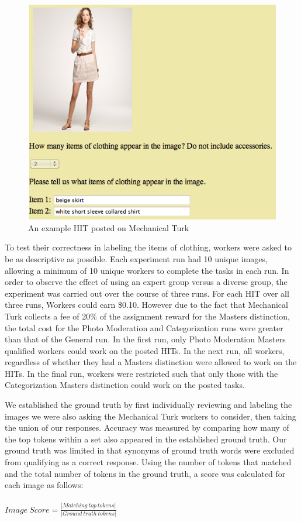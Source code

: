 \documentclass{chi2012}
\newcommand{\tab}{\hspace*{2em}}
\begin{document}
\begin{figure}
\centering
\includegraphics[width=0.9\columnwidth]{Figure1}
\caption{An example HIT posted on Mechanical Turk}
\label{fig:figure1}
\end{figure}

\tab To test their correctness in labeling the items of clothing, workers were asked to be as descriptive as possible. Each experiment run had 10 unique images, allowing a minimum of 10 unique workers to complete the tasks in each run. In order to observe the effect of using an expert group versus a diverse group, the experiment was carried out over the course of three runs. For each HIT over all three runs, Workers could earn \$0.10. However due to the fact that Mechanical Turk collects a fee of 20\% of the assignment reward for the Masters distinction, the total cost for the Photo Moderation and Categorization runs were greater than that of the General run. In the first run, only Photo Moderation Masters qualified workers could work on the posted HITs. In the next run, all workers, regardless of whether they had a Masters distinction were allowed to work on the HITs. In the final run, workers were restricted such that only those with the Categorization Masters distinction could work on the posted tasks. 

We established the ground truth by first individually reviewing and labeling the images we were also asking the Mechanical Turk workers to consider, then taking the union of our responses. Accuracy was measured by comparing how many of the top tokens within a set also appeared in the established ground truth. Our ground truth was limited in that synonyms of ground truth words were excluded from qualifying as a correct response. Using the number of tokens that matched and the total number of tokens in the ground truth, a score was calculated for each image as follows:
\\
\\
\begin{math}
Image \ Score=\frac{|Matching \ top \ tokens|}{|Ground \ truth \ tokens|}
\end{math}
\\
\\
\end{document}
